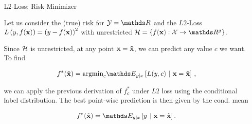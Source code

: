 \documentclass[11pt,compress,t,notes=noshow, xcolor=table]{beamer}
\begin{document}
\begin{vbframe}{L2-Loss: Risk Minimizer}

Let us consider the (true) risk for  $\Yspace = \R$ and the $L2$-Loss $L\left(y, f(\mathbf{x})\right) = \left(y-f(\mathbf{x})\right)^2$ with unrestricted $\Hspace = \{\fx: \Xspace \to \R^g\}$.

\lz

Since $\mathcal{H}$ is unrestricted, at any point $\mathbf{x} = \tilde{\mathbf{x}}$, we can predict any value $c$ we want. To find 

$$\fbayes(\xtil) = \mbox{argmin}_c \E_{y|x}\left[L(y, c)~|~ \xv = \xtil \right]\,,$$ 

we can apply the previous derivation of $f_{c}^{\ast}$ under $L2$ loss using the conditional label distribution. The best point-wise prediction is then given by the cond. mean

$$f^{\ast}(\xtil) = \E_{y|x} \left[y ~|~ \xv = \xtil \right]. $$






\end{vbframe}
\end{document}
